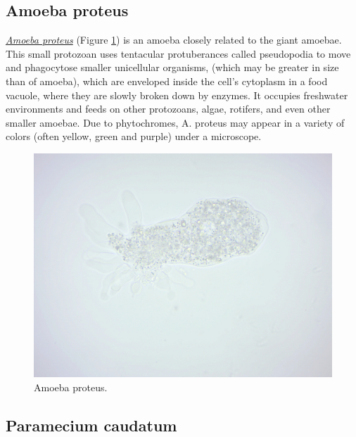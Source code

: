 \subsection{Amoeba proteus}\label{amoeba-proteus}

\href{https://en.wikipedia.org/wiki/Amoeba_proteus}{\emph{Amoeba
proteus}} (Figure \ref{fig:amoeba}) is an amoeba closely related to the
giant amoebae. This small protozoan uses tentacular protuberances called
pseudopodia to move and phagocytose smaller unicellular organisms,
(which may be greater in size than of amoeba), which are enveloped
inside the cell's cytoplasm in a food vacuole, where they are slowly
broken down by enzymes. It occupies freshwater environments and feeds on
other protozoans, algae, rotifers, and even other smaller amoebae. Due
to phytochromes, A. proteus may appear in a variety of colors (often
yellow, green and purple) under a microscope.

\begin{figure}

{\centering \includegraphics[width=0.7\linewidth]{./figures/protists/Amoeba_proteus} 

}

\caption{Amoeba proteus.}\label{fig:amoeba}
\end{figure}

\subsection{Paramecium caudatum}\label{paramecium-caudatum}

